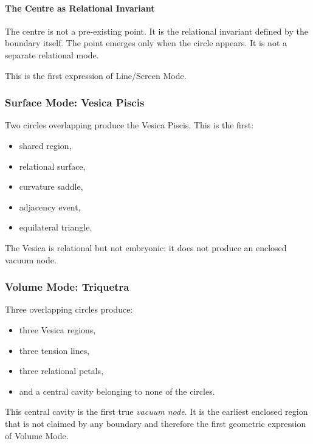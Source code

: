 \paragraph*{The Centre as Relational Invariant}

The centre is not a pre-existing point.  
It is the relational invariant defined by the boundary itself.  
The point emerges only when the circle appears.  
It is not a separate relational mode.

This is the first expression of Line/Screen Mode.

\subsubsection{Surface Mode: Vesica Piscis}

Two circles overlapping produce the Vesica Piscis. This is the first:

\begin{itemize}
    \item shared region,
    \item relational surface,
    \item curvature saddle,
    \item adjacency event,
    \item equilateral triangle.
\end{itemize}

The Vesica is relational but not embryonic: it does not produce an enclosed vacuum node.

\subsubsection{Volume Mode: Triquetra}

Three overlapping circles produce:

\begin{itemize}
    \item three Vesica regions,
    \item three tension lines,
    \item three relational petals,
    \item and a central cavity belonging to none of the circles.
\end{itemize}

This central cavity is the first true \emph{vacuum node}.  
It is the earliest enclosed region that is not claimed by any boundary and therefore the first geometric expression of Volume Mode.

